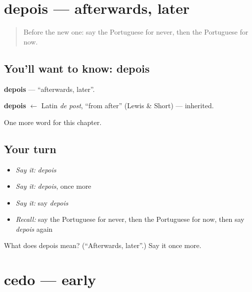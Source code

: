\section[depois]{depois — afterwards, later}

\label{lesson:PT-C71-depois}



\begin{quote}
Before the new one: say the Portuguese for never, then the Portuguese for now.
\end{quote}

\subsection*{You'll want to know: depois}
\textbf{depois} — \textquotedblleft{}afterwards, later\textquotedblright{}.

\begin{cousinweb}
\textbf{depois} $\leftarrow$ Latin \emph{de post}, \textquotedblleft{}from after\textquotedblright{} (Lewis \& Short) — inherited.
\end{cousinweb}

\begin{grammarlens}[title={What you've built}]
One more word for this chapter.
\end{grammarlens}

\subsection*{Your turn}
\begin{itemize}
\raggedright
  \item \emph{Say it:} \emph{depois}
  \item \emph{Say it:} \emph{depois}, once more
  \item \emph{Say it:} say \emph{depois}
  \item \emph{Recall:} say the Portuguese for never, then the Portuguese for now, then say \emph{depois} again
\end{itemize}

\begin{tcolorbox}[breakable,colback=teal!4,colframe=teal!35!black,title={Before you move on}]
What does depois mean? (\textquotedblleft{}Afterwards, later\textquotedblright{}.) Say it once more.
\end{tcolorbox}
\section[cedo]{cedo — early}

